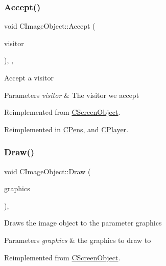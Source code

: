 \subsubsection{\texorpdfstring{Accept()}{Accept()}}
{\footnotesize\ttfamily void C\+Image\+Object\+::\+Accept (\begin{DoxyParamCaption}\item[{\mbox{\hyperlink{class_c_visitor}{C\+Visitor}} $\ast$}]{visitor }\end{DoxyParamCaption})\hspace{0.3cm}{\ttfamily [inline]}, {\ttfamily [override]}, {\ttfamily [virtual]}}

Accept a visitor 
\begin{DoxyParams}{Parameters}
{\em visitor} & The visitor we accept \\
\hline
\end{DoxyParams}


Reimplemented from \mbox{\hyperlink{class_c_screen_object_a1420b59508fdab637367654438223832}{C\+Screen\+Object}}.



Reimplemented in \mbox{\hyperlink{class_c_pens_a054fe093d31223c2ad66ab328e158f33}{C\+Pens}}, and \mbox{\hyperlink{class_c_player_a524a0fd1d55d4ac0a55d00d0492018f8}{C\+Player}}.

\mbox{\label{class_c_image_object_a7f550785caf6f15a5a521ee69acc03c4}} 
\subsubsection{\texorpdfstring{Draw()}{Draw()}}
{\footnotesize\ttfamily void C\+Image\+Object\+::\+Draw (\begin{DoxyParamCaption}\item[{Gdiplus\+::\+Graphics $\ast$}]{graphics }\end{DoxyParamCaption})\hspace{0.3cm}{\ttfamily [override]}, {\ttfamily [virtual]}}

Draws the image object to the parameter graphics 
\begin{DoxyParams}{Parameters}
{\em graphics} & the graphics to draw to \\
\hline
\end{DoxyParams}


Reimplemented from \mbox{\hyperlink{class_c_screen_object_ad9481ae325ca2374986c61fb6545fbe2}{C\+Screen\+Object}}.

